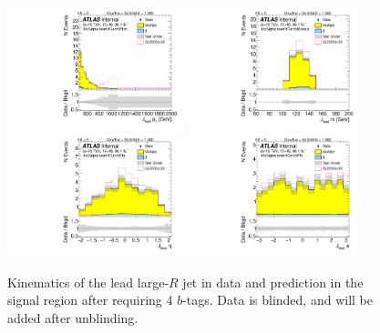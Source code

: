 \begin{figure}[htbp!]
\begin{center}
\includegraphics[width=0.45\textwidth,angle=-90]{figures/boosted/Signal/b77_FourTag_Signal_leadHCand_Pt_m_blind.pdf}
\includegraphics[width=0.45\textwidth,angle=-90]{figures/boosted/Signal/b77_FourTag_Signal_leadHCand_Mass_s_blind.pdf}\\
\includegraphics[width=0.45\textwidth,angle=-90]{figures/boosted/Signal/b77_FourTag_Signal_leadHCand_Eta_blind.pdf}
\includegraphics[width=0.45\textwidth,angle=-90]{figures/boosted/Signal/b77_FourTag_Signal_leadHCand_Phi_blind.pdf}
  \caption{Kinematics of the lead large-$R$ jet in data and prediction in the signal region after requiring 4 $b$-tags. Data is blinded, and will be added after unblinding.}
  \label{fig:boosted-4b-signal-blind-ak10-lead}
\end{center}
\end{figure}

